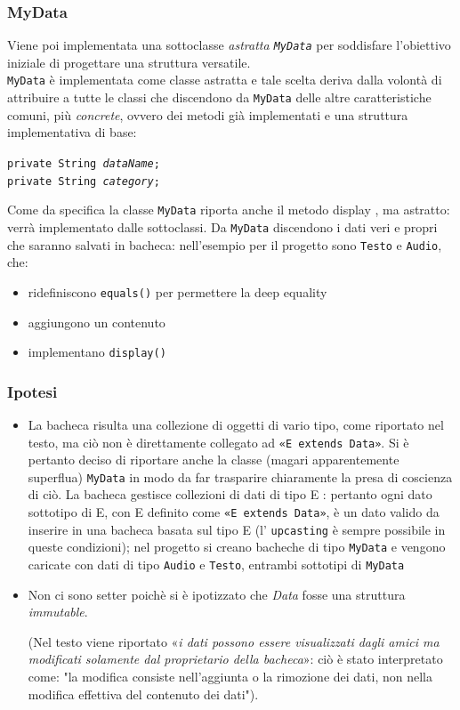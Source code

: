 \documentclass[10pt, a4paper]{article}
\begin{document}
\subsubsection{MyData}
Viene poi implementata una sottoclasse \textit{astratta \texttt{MyData}} per soddisfare l'obiettivo iniziale di progettare una struttura versatile.\\
\texttt{MyData} è implementata come classe astratta e tale scelta deriva dalla volontà di attribuire a tutte le classi che discendono da \texttt{MyData} delle altre caratteristiche comuni, più \textit{concrete}, ovvero dei metodi già implementati e una struttura implementativa di base:
\begin{center}
	\texttt{private String \emph{dataName};\\
	private String \emph{category};\\}
\end{center}
Come da specifica la classe \texttt{MyData} riporta anche il metodo display , ma astratto: verrà implementato dalle sottoclassi.
Da \texttt{MyData} discendono i dati veri e propri che saranno salvati in bacheca: nell'esempio per il progetto sono \texttt{Testo} e \texttt{Audio}, che:
\begin{itemize}
	\item ridefiniscono \texttt{equals()} per permettere la deep equality
	\item aggiungono un contenuto
	\item implementano \texttt{display()}
\end{itemize}

\subsubsection{Ipotesi}
\begin{itemize}
	\item La bacheca risulta una collezione di oggetti di vario tipo, come riportato nel testo, ma ciò non è direttamente collegato ad \texttt{«E extends Data»}. Si è pertanto deciso di riportare anche la classe (magari apparentemente superflua) \texttt{MyData} in modo da far trasparire chiaramente la presa di coscienza di ciò. La bacheca gestisce collezioni di dati di tipo E : pertanto ogni dato sottotipo di E, con E definito come \texttt{«E extends Data»}, è un dato valido da inserire in una bacheca basata sul tipo E (l' \texttt{upcasting} è sempre possibile in queste condizioni); nel progetto si creano bacheche di tipo \texttt{MyData} e vengono caricate con dati di tipo \texttt{Audio} e \texttt{Testo}, entrambi sottotipi di \texttt{MyData}
	\item Non ci sono setter poichè si è ipotizzato che \textit{Data} fosse una struttura \textit{immutable}.\\
	\begin{footnotesize}
(Nel testo viene riportato «\textit{i dati possono essere
visualizzati dagli amici ma modificati solamente dal proprietario della bacheca}»: ciò è stato interpretato come: "la modifica consiste nell'aggiunta o la rimozione dei dati, non nella  modifica effettiva del contenuto dei dati").
\end{footnotesize}
 \end{itemize}
 
\end{document}
